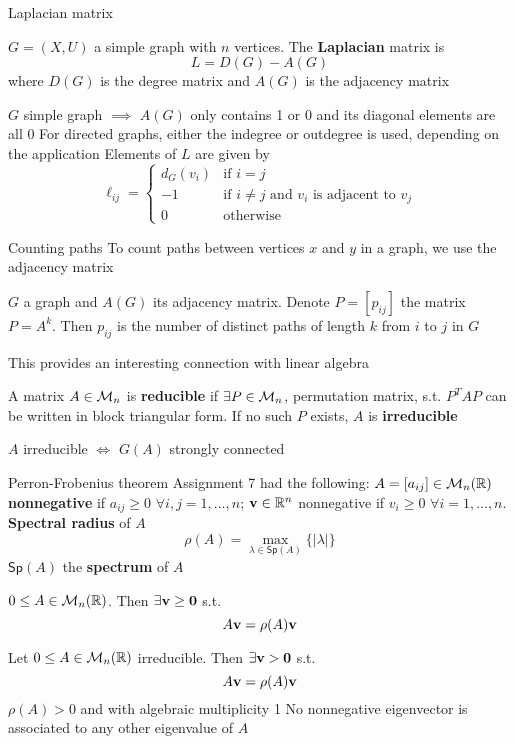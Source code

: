 \documentclass[aspectratio=43]{beamer}
\begin{document}
\begin{frame}{Laplacian matrix}
\begin{definition}
	$G=(X,U)$ a simple graph with $n$ vertices. The \textbf{Laplacian} matrix is 
	\[
		L=D(G)-A(G)
	\]
	where $D(G)$ is the degree matrix and $A(G)$ is the adjacency matrix
\end{definition}
$G$ simple graph $\implies$ $A(G)$ only contains 1 or 0 and its diagonal elements are all 0
\vfill
For directed graphs, either the indegree or outdegree is used, depending on the application
\vfill
Elements of $L$ are given by
\[
\ell_{ij}=\begin{cases}
	d_G(v_{i}) & \text{if } i=j\\
	-1 & \text{if } i\neq j \text{ and } v_{i} 
	\text{ is adjacent to }v_{j}\\
	0 & \text{otherwise}
\end{cases}
\]
\end{frame}

\begin{frame}{Counting paths}
	To count paths between vertices $x$ and $y$ in a graph, we use the adjacency matrix
	\vfill
	\begin{theorem}
		$G$ a graph and $A(G)$ its adjacency matrix. Denote $P=[p_{ij}]$ the matrix $P=A^k$. Then $p_{ij}$ is the number of distinct paths of length $k$ from $i$ to $j$ in $G$
	\end{theorem}
	\vfill
	This provides an interesting connection with linear algebra
	\begin{definition}
		A matrix $A\in\mathcal{M}_n$ is \textbf{reducible} if $\exists P\in\mathcal{M}_n$, permutation matrix, s.t. $P^TAP$ can be written in block triangular form. If no such $P$ exists, $A$ is \textbf{irreducible}
	\end{definition}
	\vfill
	\begin{theorem}
		$A$ irreducible $\iff$ $G(A)$ strongly connected
	\end{theorem}
\end{frame}


\begin{frame}{Perron-Frobenius theorem}
Assignment 7 had the following:
\vfill
$A=[a_{ij}]\in\mathcal{M}_n(\mathbb{R})$ \textbf{nonnegative} if $a_{ij}\geq 0$ $\forall i,j=1,\ldots,n$; $\mathbf{v}\in\mathbb{R}^n$ nonnegative if $v_i\geq 0$ $\forall i=1,\ldots,n$.  \textbf{Spectral radius} of $A$
\[
\rho(A) = \max_{\lambda\in\mathsf{Sp}(A)}\{|\lambda|\}
\]
$\mathsf{Sp}(A)$ the \textbf{spectrum} of $A$
\vfill
\begin{theorem}
$0\leq A\in\mathcal{M}_n(\mathbb{R})$. Then $\exists\bv\geq\b0$ s.t. 
\[
	A\mathbf{v}=\rho(A)\mathbf{v}
\]
\end{theorem}
\vfill

\begin{theorem}
	\label{th:PF}
	Let $0\leq A\in \mathcal{M}_n(\mathbb{R})$ irreducible. Then $\exists\bv>\b0$ s.t.
	\[
		A\mathbf{v}=\rho(A)\mathbf{v}
	\]
	$\rho(A)>0$ and with algebraic multiplicity 1
	\vskip0.5cm
	No nonnegative eigenvector is associated to any other eigenvalue of $A$
\end{theorem}
\end{frame}
\end{document}
